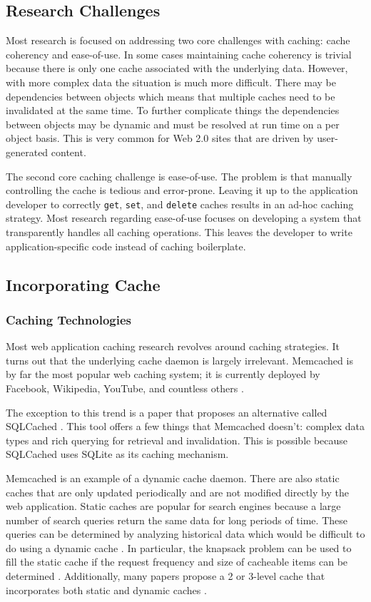 \documentclass[12pt]{ucthesis}
\begin{document}
\subsection{Research Challenges}
Most research is focused on addressing two core challenges with caching: cache coherency and ease-of-use.
In some cases maintaining cache coherency is trivial because there is only one cache associated with the underlying data.
However, with more complex data the situation is much more difficult.
There may be dependencies between objects which means that multiple caches need to be invalidated at the same time.
To further complicate things the dependencies between objects may be dynamic and must be resolved at run time on a per object basis.
This is very common for Web 2.0 sites that are driven by user-generated content.

The second core caching challenge is ease-of-use.
The problem is that manually controlling the cache is tedious and error-prone.
Leaving it up to the application developer to correctly {\tt get}, {\tt set}, and {\tt delete} caches results in an ad-hoc caching strategy.
Most research regarding ease-of-use focuses on developing a system that transparently handles all caching operations.
This leaves the developer to write application-specific code instead of caching boilerplate.

\subsection{Incorporating Cache}
\subsubsection{Caching Technologies}
Most web application caching research revolves around caching strategies.
It turns out that the underlying cache daemon is largely irrelevant.
{\textsf Memcached} is by far the most popular web caching system; it is currently deployed by Facebook, Wikipedia, YouTube, and countless others \cite{memcachedDotOrg}.

The exception to this trend is a paper that proposes an alternative called SQLCached \cite{sqlCached}.
This tool offers a few things that {\textsf Memcached} doesn't: complex data types and rich querying for retrieval and invalidation.
This is possible because SQLCached uses SQLite as its caching mechanism.

{\textsf Memcached} is an example of a dynamic cache daemon.
There are also static caches that are only updated periodically and are not modified directly by the web application.
Static caches are popular for search engines because a large number of search queries return the same data for long periods of time.
These queries can be determined by analyzing historical data which would be difficult to do using a dynamic cache \cite{designTradeOffsSearchEngine}.
In particular, the knapsack problem can be used to fill the static cache if the request frequency and size of cacheable items can be determined \cite{designTradeOffsSearchEngine}.
Additionally, many papers propose a 2 or 3-level cache that incorporates both static and dynamic caches \cite{cacheAdmissionPolicies, designTradeOffsSearchEngine}.
\end{document}
